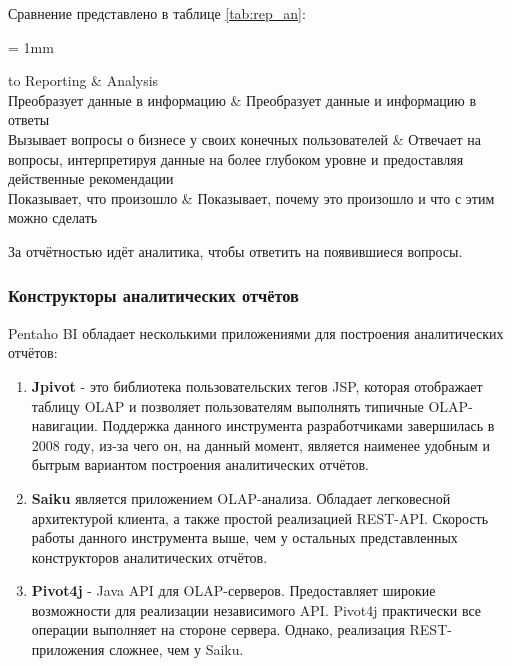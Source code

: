 Сравнение представлено в таблице \ref{tab:rep_an}:

\tabulinesep = 1mm
\begin{longtabu} to \textwidth {| X[c,m] | X[c,m] |}
	\firsthline\hline
	Reporting & Analysis\\ \hline
	\endfirsthead
	Преобразует данные в информацию & Преобразует данные и информацию в ответы\\ \hline
	Вызывает вопросы о бизнесе у своих конечных пользователей & Отвечает на вопросы, интерпретируя данные на более глубоком уровне и предоставляя действенные рекомендации\\ \hline
	Показывает, что произошло & Показывает, почему это произошло и что с этим можно сделать\\ \hline
	\caption{Сравнение Reporting и Analysis}
	\label{tab:rep_an}
\end{longtabu}

За отчётностью идёт аналитика, чтобы ответить на появившиеся вопросы.

\subsubsection{Конструкторы аналитических отчётов}

Pentaho BI обладает несколькими приложениями для построения аналитических отчётов:

\begin{enumerate}
	\item \textbf{Jpivot} - это библиотека пользовательских тегов JSP, которая отображает таблицу OLAP и позволяет пользователям выполнять типичные OLAP-навигации. Поддержка данного инструмента разработчиками завершилась в 2008 году, из-за чего он, на данный момент, является наименее удобным и бытрым вариантом построения аналитических отчётов.
	
	\item \textbf{Saiku} является приложением OLAP-анализа. Обладает легковесной архитектурой клиента, а также простой реализацией REST-API. Скорость работы данного инструмента выше, чем у остальных представленных конструкторов аналитических отчётов.
	
	\item \textbf{Pivot4j} - Java API для OLAP-серверов. Предоставляет широкие возможности для реализации независимого API. Pivot4j практически все операции выполняет на стороне сервера. Однако, реализация REST-приложения сложнее, чем у Saiku.
\end{enumerate}


